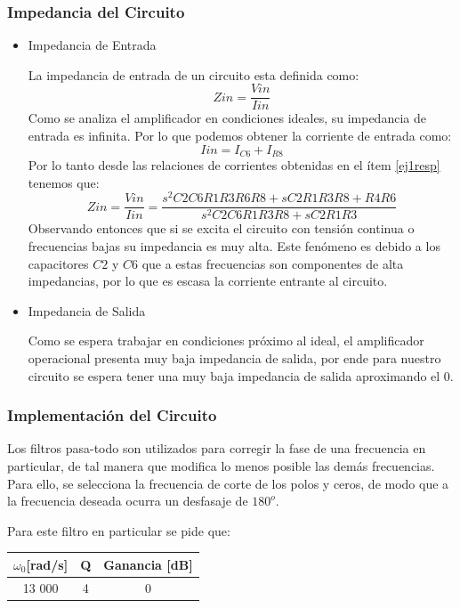 \subsubsection{Impedancia del Circuito}

\begin{itemize}
    \item Impedancia de Entrada
    
    La impedancia de entrada de un circuito esta definida como:
    $$Zin = \frac{Vin}{Iin}$$
    Como se analiza el amplificador en condiciones ideales, su impedancia de entrada es infinita. Por lo que podemos obtener la corriente de entrada como:
    $$Iin = I_{C6}+I_{R8}$$
    Por lo tanto desde las relaciones de corrientes obtenidas en el ítem \ref{ej1resp} tenemos que:
    \begin{equation}
        Zin = \frac{Vin}{Iin} = \frac{s^2C2C6R1R3R6R8 + sC2R1R3R8 + R4R6}{s^2C2C6R1R3R8 + sC2R1R3} 
    \end{equation}
    Observando entonces que si se excita el circuito con tensión continua o frecuencias bajas su impedancia es muy alta. Este fenómeno es debido a los capacitores $C2$ y $C6$ que a estas frecuencias son componentes de alta impedancias, por lo que es escasa la corriente entrante al circuito. 
    
    \item Impedancia de Salida
    
    Como se espera trabajar en condiciones próximo al ideal, el amplificador operacional presenta muy baja impedancia de salida, por ende para nuestro circuito se espera tener una muy baja impedancia de salida aproximando el 0. 
\end{itemize}

\subsubsection{Implementación del Circuito}

Los filtros pasa-todo son utilizados para corregir la fase de una frecuencia en particular, de tal manera que modifica lo menos posible las demás frecuencias. Para ello, se selecciona la frecuencia de corte de los polos y ceros, de modo que a la frecuencia deseada ocurra un desfasaje de $180^o$. 

Para este filtro en particular se pide que:

\begin{table}[h]
\centering
\begin{tabular}{ccc}
\hline
$\omega_0${[}rad/s{]} & Q & Ganancia {[}dB{]} \\ \hline
13 000        & 4 & 0                 \\ \hline
\end{tabular}
\end{table}

